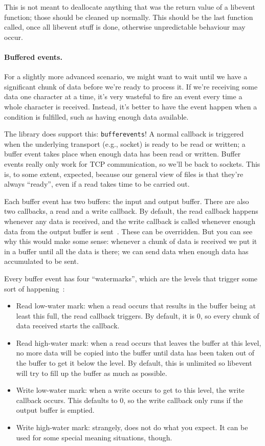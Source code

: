This is not meant to deallocate anything that was the return value of a libevent function; those should be cleaned up normally. This should be the last function called, once all libevent stuff is done, otherwise unpredictable behaviour may occur.

\paragraph{Buffered events.} For a slightly more advanced scenario, we might want to wait until we have a significant chunk of data before we're ready to process it. If we're receiving some data one character at a time, it's very wasteful to fire an event every time a whole character is received. Instead, it's better to have the event happen when a condition is fulfilled, such as having enough data available.

The library does support this: \texttt{bufferevents}! A normal callback is triggered when the underlying transport (e.g., socket) is ready to be read or written; a buffer event takes place when enough data has been read or written. Buffer events really only work for TCP communication, so we'll be back to sockets. This is, to some extent, expected, because our general view of files is that they're always ``ready'', even if a read takes time to be carried out.

Each buffer event has two buffers: the input and output buffer. There are also two callbacks, a read and a write callback. By default, the read callback happens whenever any data is received, and the write callback is called whenever enough data from the output buffer is sent~\cite{libevent}. These can be overridden. But you can see why this would make some sense: whenever a chunk of data is received we put it in a buffer until all the data is there; we can send data when enough data has accumulated to be sent.

Every buffer event has four ``watermarks'', which are the levels that trigger some sort of happening~\cite{libevent}:
\begin{itemize}
	\item Read low-water mark: when a read occurs that results in the buffer being at least this full, the read callback triggers. By default, it is 0, so every chunk of data received starts the callback.
	\item Read high-water mark: when a read occurs that leaves the buffer at this level, no more data will be copied into the buffer until data has been taken out of the buffer to get it below the level. By default, this is unlimited so libevent will try to fill up the buffer as much as possible.
	\item Write low-water mark: when a write occurs to get to this level, the write callback occurs. This defaults to 0, so the write callback only runs if the output buffer is emptied.
	\item Write high-water mark: strangely, does not do what you expect. It can be used for some special meaning situations, though.
\end{itemize}

